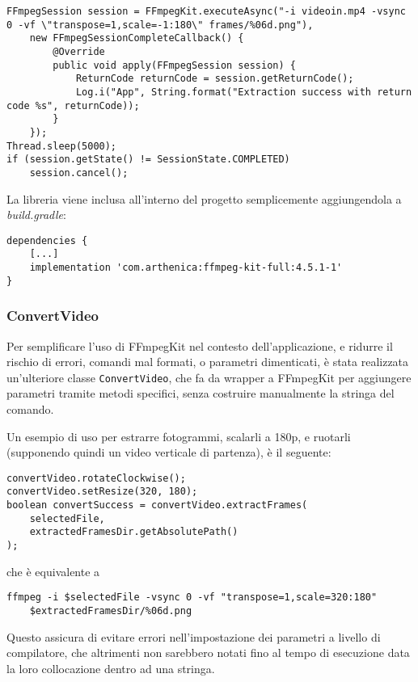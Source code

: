 \begin{lstlisting}
FFmpegSession session = FFmpegKit.executeAsync("-i videoin.mp4 -vsync 0 -vf \"transpose=1,scale=-1:180\" frames/%06d.png"),
    new FFmpegSessionCompleteCallback() {
        @Override
        public void apply(FFmpegSession session) {
            ReturnCode returnCode = session.getReturnCode();
            Log.i("App", String.format("Extraction success with return code %s", returnCode));
        }
    });
Thread.sleep(5000);
if (session.getState() != SessionState.COMPLETED)
    session.cancel();
\end{lstlisting}

La libreria viene inclusa all'interno del progetto semplicemente aggiungendola a 
\emph{build.gradle}:

\begin{verbatim}
dependencies {
    [...]
    implementation 'com.arthenica:ffmpeg-kit-full:4.5.1-1'
}
\end{verbatim}

\subsubsection*{ConvertVideo}

Per semplificare l'uso di FFmpegKit nel contesto dell'applicazione, e ridurre il rischio
di errori, comandi mal formati, o parametri dimenticati, è stata realizzata un'ulteriore 
classe \texttt{ConvertVideo}, che fa da wrapper a FFmpegKit per aggiungere parametri tramite 
metodi specifici, senza costruire manualmente la stringa del comando.

Un esempio di uso per estrarre fotogrammi, scalarli a 180p, e ruotarli (supponendo quindi un 
video verticale di partenza), è il seguente:

\begin{lstlisting}
convertVideo.rotateClockwise();
convertVideo.setResize(320, 180);
boolean convertSuccess = convertVideo.extractFrames(
    selectedFile,
    extractedFramesDir.getAbsolutePath()
);
\end{lstlisting}

che è equivalente a 

\begin{verbatim}
ffmpeg -i $selectedFile -vsync 0 -vf "transpose=1,scale=320:180" 
    $extractedFramesDir/%06d.png
\end{verbatim}

Questo assicura di evitare errori nell'impostazione dei parametri a livello di compilatore, 
che altrimenti non sarebbero notati fino al tempo di esecuzione data la loro collocazione dentro
ad una stringa.

